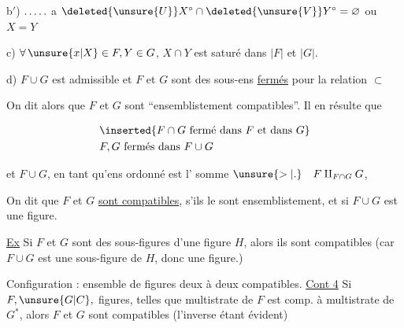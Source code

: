 b$'$) $\ldotp\ldotp\ldotp\ldotp\ldotp$  a $\deleted{\unsure{U}}X^\circ\cap\deleted{\unsure{V}}Y^\circ=\varnothing$ ou $X=Y$

c) $\forall\,\unsure{x|X}\in F,Y\in G$, $X\cap Y$ est saturé dans $|F|$ et  $|G|$. 

d) $F\cup G$ est admissible\unsure{,)|,} et $F$ et $G$ sont des sous-ens  \uline{fermés} pour la relation $\subset$

On dit alors que  $F$ et $G$ sont ``ensemblistement compatibles''. Il en résulte que

\[
\begin{aligned}
&\inserted{F\cap G\ \text{fermé dans } F \text{ et dans } G}\\
&F,G\ \text{fermés dans } F\cup G
\end{aligned}
\]

et $F\cup G$, en tant qu'ens  ordonné est l'  somme  $\unsure{>|.}\quad F\amalg_{F\cap G}G$,


On dit que $F$ et $G$ \uline{sont compatibles},  s'ils le sont ensemblistement, et si $F\cup G$ est une figure. 

\uline{Ex} Si $F$ et $G$ sont des sous-figures d'une figure $H$, alors ils sont compatibles (car  $F\cup G$ est une sous-figure de $H$, donc une figure.)

Configuration : ensemble de figures deux à deux compatibles.
\uline{Cont 4} Si $F,\unsure{G|C},$  figures, telles que  multistrate de $F$ est comp. à  multistrate de $G^{*}$, alors $F$ et $G$ sont compatibles (l'inverse étant évident)

